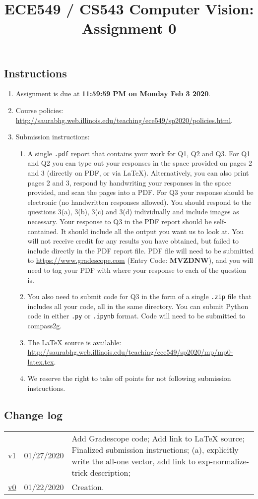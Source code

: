 \documentclass{article}
\title{\LARGE ECE549 / CS543 Computer Vision: Assignment 0}
\date{}
\begin{document}
\maketitle
\subsection*{Instructions}
\begin{enumerate}
  \item Assignment is due at \textbf{11:59:59 PM on Monday Feb 3 2020}.
  \item Course policies: \url{http://saurabhg.web.illinois.edu/teaching/ece549/sp2020/policies.html}.
  \item Submission instructions:
  \begin{enumerate}
      \item A single \texttt{.pdf} report that contains your work for Q1, Q2 and Q3. For Q1 and Q2 you can type out your responses in the space provided on pages 2 and 3 (directly on PDF, or via \LaTeX{}). Alternatively, you can also print pages 2 and 3, respond by handwriting your responses in the space provided, and scan the pages into a PDF. For Q3 your response should be electronic (no handwritten responses allowed). You should respond to the questions 3(a), 3(b), 3(c) and 3(d) individually and include images as necessary. Your response to Q3 in the PDF report should be self-contained. It should include all the output you want us to look at. You will not receive credit for any results you have obtained, but failed to include directly in the PDF report file. PDF file will need to be submitted to \url{https://www.gradescope.com} (Entry Code: \textbf{MVZDNW}), and you will need to tag your PDF with where your response to each of the question is.
      \item You also need to submit code for Q3 in the form of a single \texttt{.zip} file that includes all your code, all in the same directory. You can submit Python code in either \texttt{.py} or \texttt{.ipynb} format. Code will need to be submitted to compass2g.
      \item The \LaTeX{} source is available:  \url{http://saurabhg.web.illinois.edu/teaching/ece549/sp2020/mp/mp0-latex.tex}.
      \item We reserve the right to take off points for not following submission instructions.
  \end{enumerate}
\end{enumerate}

\subsection*{Change log}
{
\renewcommand{\arraystretch}{1.5}
\begin{tabular}{llp{5in}}
   v1 & 01/27/2020 & 
     Add Gradescope code; Add link to \LaTeX{} source; Finalized submission instructions; \newline
     1(a), explicitly write the all-one vector, add link to exp-normalize-trick description;\\
   \href{http://saurabhg.web.illinois.edu/teaching/ece549/sp2020/mp/mp0-v0.pdf}{v0} & 01/22/2020 & Creation.
\end{tabular}
}
\end{document}
